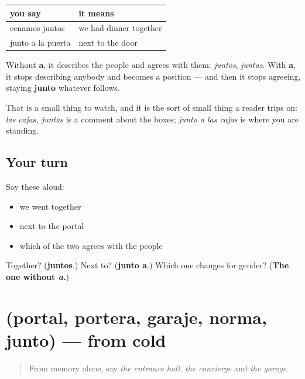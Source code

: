 \begin{grammarlens}[title={Grammar Lens: the a decides}]
\noindent
\begin{tabularx}{\linewidth}{@{}>{\raggedright\arraybackslash}X>{\raggedright\arraybackslash}X@{}}
\toprule
\textbf{you say} & \textbf{it means} \\
\midrule
cenamos juntos & we had dinner together \\
junto a la puerta & next to the door \\
\bottomrule
\end{tabularx}

Without \textbf{a}, it describes the people and agrees with them: \emph{juntos}, \emph{juntas}. With \textbf{a}, it stops describing anybody and becomes a position — and then it stops agreeing, staying \textbf{junto} whatever follows.

That is a small thing to watch, and it is the sort of small thing a reader trips on: \emph{las cajas, juntas} is a comment about the boxes; \emph{junto a las cajas} is where you are standing.
\end{grammarlens}

\subsection*{Your turn}
Say these aloud:

\begin{itemize}
\raggedright
  \item we went together
  \item next to the portal
  \item which of the two agrees with the people
\end{itemize}

\begin{tcolorbox}[breakable,colback=teal!4,colframe=teal!35!black,title={Before you move on}]
Together? (\textbf{juntos}.) Next to? (\textbf{junto a}.) Which one changes for gender? (\textbf{The one without \emph{a}.})
\end{tcolorbox}
\section[(portal, portera, garaje, norma, junto)]{(portal, portera, garaje, norma, junto) — from cold}

\label{lesson:ES-R433-repaso-edificio}



\begin{quote}
From memory alone, say \emph{the entrance hall}, \emph{the concierge} and \emph{the garage}.
\end{quote}

